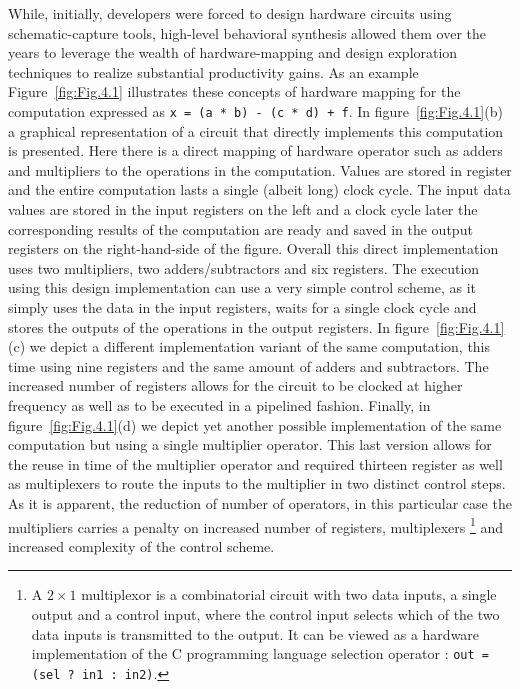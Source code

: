While, initially, developers were forced to design hardware circuits using 
schematic-capture tools, high-level behavioral synthesis allowed them over 
the years to leverage the wealth of hardware-mapping and design exploration 
techniques to realize substantial productivity gains. 
As an example Figure~\ref{fig:Fig.4.1} illustrates these concepts
of hardware mapping for the computation expressed as
{\tt x = (a * b) - (c * d) + f}.
In figure~\ref{fig:Fig.4.1}(b) a graphical representation of a circuit 
that directly implements this computation is presented. 
Here there is a direct mapping of hardware operator such
as adders and multipliers to the operations in the computation. 
Values are stored in register and the entire computation lasts a 
single (albeit long) clock cycle. 
The input data values are stored in the input registers on the left and 
a clock cycle later the corresponding results of the computation are ready 
and saved in the output registers on the right-hand-side of the figure. 
Overall this direct implementation uses two multipliers, two adders/subtractors 
and six registers. 
The execution using this design implementation can use a very simple
control scheme, as it simply uses the data in the  input registers, waits
for a single clock cycle and stores the outputs of the operations in the
output registers. 
In figure~\ref{fig:Fig.4.1}(c) we depict a different implementation variant 
of the same computation, this time using nine registers and the same amount 
of adders and subtractors. The increased number of registers allows for the 
circuit to be clocked at higher frequency as well as to be executed in a 
pipelined fashion. 
Finally, in figure~\ref{fig:Fig.4.1}(d) we depict yet another possible 
implementation of the same computation but using a single multiplier operator. 
This last version allows for the reuse in time of the multiplier operator and 
required thirteen register as well as multiplexers to route the inputs to the 
multiplier in two distinct control steps. As it is apparent, the reduction of 
number of operators, in this particular case the multipliers carries a penalty 
on increased number of registers, 
multiplexers \footnote{A $2\times1$ multiplexor is a combinatorial circuit with 
two data inputs, a single output and a control input, where the control input 
selects which of the two data inputs is transmitted to the output. It can be 
viewed as a hardware implementation of the C programming language selection 
operator : {\tt out = (sel ? in1 : in2)}.} and increased complexity of the 
control scheme.\\

